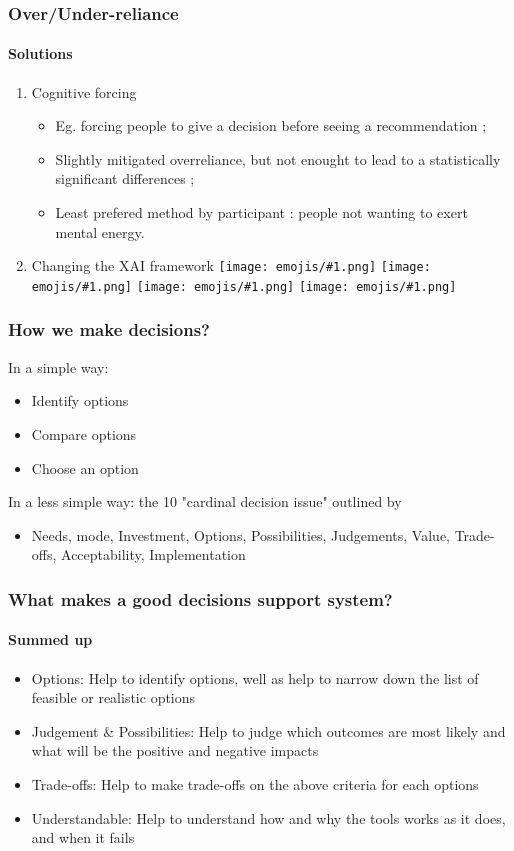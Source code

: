 \documentclass[compress,12pt]{beamer}
\newcommand{\emoji}[1]{\texttt{[image: emojis/\#1.png]}}
\begin{document}
\begin{frame}
      \frametitle{Over/Under-reliance}
      \framesubtitle{Solutions}
      \begin{enumerate}
            \item Cognitive forcing \begin{itemize}
                  \item Eg. forcing people to give a decision before seeing a recommendation ;
                  \item Slightly mitigated overreliance, but not enought to lead to a statistically significant differences ;
                  \item Least prefered method by participant : people not wanting to exert mental energy.
            \end{itemize}
            \item Changing the XAI framework \emoji{smirking-face} \emoji{thinking-face} \emoji{thought-balloon} \emoji{light-bulb}
      \end{enumerate}
\end{frame}

\begin{frame}
      \frametitle{How we make decisions?}
      In a simple way: \begin{itemize}
            \item Identify options
            \item Compare options
            \item Choose an option
      \end{itemize}
      In a less simple way: the 10 "cardinal decision issue" outlined by \cite{evidence-based-decision-management} \begin{itemize}
            \item Needs, mode, Investment, Options, Possibilities, Judgements, Value, Trade-offs, Acceptability, Implementation
      \end{itemize}
\end{frame}

\begin{frame}
      \frametitle{What makes a good decisions support system?}
      \framesubtitle{Summed up}
      \begin{itemize}
            \item Options: Help to identify options, well as help to narrow down the list of feasible or realistic options
            \item Judgement \& Possibilities: Help to judge which outcomes are most likely and what will be the positive and negative impacts
            \item Trade-offs: Help to make trade-offs on the above criteria for each options
            \item Understandable: Help to understand how and why the tools works as it does, and when it fails
      \end{itemize}
\end{frame}
\end{document}
